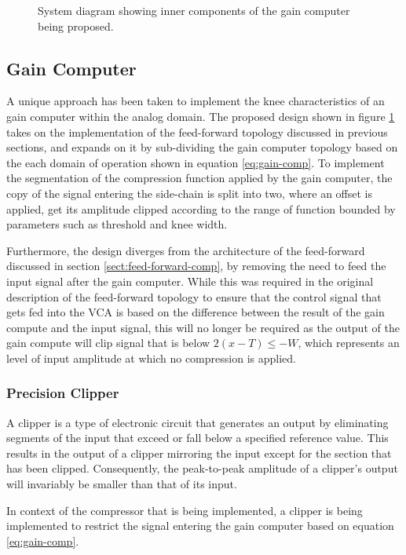 \documentclass[10pt]{article}
\begin{document}
\begin{multicols*}{2}
\begin{figure}[!t]
{\begin{tikzpicture}
                    \end{tikzpicture}%
                }
        
                \caption{System diagram showing inner components of the gain computer being proposed.}
                \label{fig:gain-comp-diagram}
        
            \end{figure}

            \subsection{Gain Computer}     
                A unique approach has been taken to implement the knee characteristics of an gain computer within the analog domain. The proposed design shown in figure \ref{fig:gain-comp-diagram} takes on the implementation of the feed-forward topology discussed in previous sections, and expands on it by sub-dividing the gain computer topology based on the each domain of operation shown in equation \ref{eq:gain-comp}. To implement the segmentation of the compression function applied by the gain computer, the copy of the signal entering the side-chain is split into two, where an offset is applied, get its amplitude clipped according to the range of function bounded by parameters such as threshold and knee width.\par
                Furthermore, the design diverges from the architecture of the feed-forward discussed in section \ref{sect:feed-forward-comp}, by removing the need to feed the input signal after the gain computer. While this was required in the original description of the feed-forward topology to ensure that the control signal that gets fed into the VCA is based on the difference between the result of the gain compute and the input signal, this will no longer be required as the output of the gain compute will clip signal that is below $2(x-T)\leq-W$, which represents an level of input amplitude at which no compression is applied.

                \subsubsection{Precision Clipper}
                    A clipper is a type of electronic circuit that generates an output by eliminating segments of the input that exceed or fall below a specified reference value. This results in the output of a clipper mirroring the input except for the section that has been clipped. Consequently, the peak-to-peak amplitude of a clipper's output will invariably be smaller than that of its input.\par
                    In context of the compressor that is being implemented, a clipper is being implemented to restrict the signal entering the gain computer based on equation \ref{eq:gain-comp}.


\end{multicols*}
\end{document}
